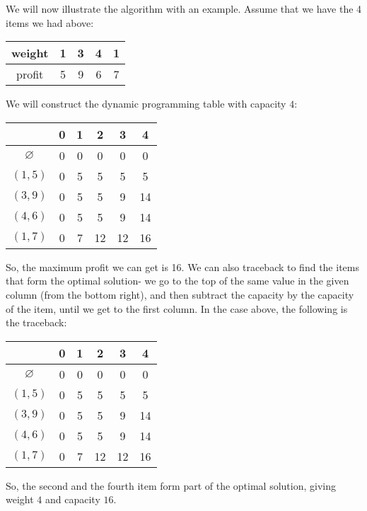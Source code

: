 \documentclass[a4paper, openany]{memoir}
\begin{document}
    We will now illustrate the algorithm with an example. Assume that we have the 4 items we had above:
    \begin{table}[H]
        \centering
        \begin{tabular}{c|cccc}
            weight & 1 & 3 & 4 & 1 \\
            \hline
            profit & 5 & 9 & 6 & 7 \\
        \end{tabular}
    \end{table}
    \noindent We will construct the dynamic programming table with capacity $4$:
    \begin{table}[H]
        \centering
        \begin{tabular}{c|ccccc}
            & 0 & 1 & 2 & 3 & 4 \\
            \hline
            $\varnothing$ & 0 & 0 & 0 & 0 & 0 \\
            $(1, 5)$ & 0 & 5 & 5 & 5 & 5 \\
            $(3, 9)$ & 0 & 5 & 5 & 9 & 14 \\
            $(4, 6)$ & 0 & 5 & 5 & 9 & 14 \\
            $(1, 7)$ & 0 & 7 & 12 & 12 & {\color{red} 16}
        \end{tabular}
    \end{table}
    \noindent So, the maximum profit we can get is 16. We can also traceback to find the items that form the optimal solution- we go to the top of the same value in the given column (from the bottom right), and then subtract the capacity by the capacity of the item, until we get to the first column. In the case above, the following is the traceback:
    \begin{table}[H]
        \centering
        \begin{tabular}{c|ccccc}
            & 0 & 1 & 2 & 3 & 4 \\
            \hline
            $\varnothing$ & 0 & 0 & 0 & 0 & 0 \\
            $(1, 5)$ & {\color{red} 0} & 5 & 5 & 5 & 5 \\
            {\color{red} $(3, 9)$} & 0 & 5 & 5 & {\color{red} 9} & 14 \\
            $(4, 6)$ & 0 & 5 & 5 & {\color{red} 9} & 14 \\
            {\color{red} $(1, 7)$} & 0 & 7 & 12 & 12 & {\color{red} 16}
        \end{tabular}
    \end{table}
    \noindent So, the second and the fourth item form part of the optimal solution, giving weight $4$ and capacity $16$.
    
\end{document}

